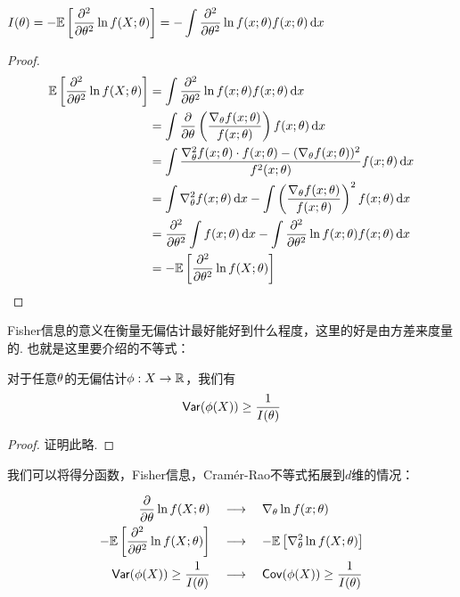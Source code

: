 \begin{proposition}
    $I(\theta) = -\mathbb{E}\left[
        \dfrac{\partial^2}{\partial\theta^2} \ln f(X;\theta)
    \right] = -\displaystyle\int \dfrac{\partial^2}{\partial\theta^2} \ln f(x;\theta) f(x;\theta) \mathop{}\!\mathrm{d}x$
\end{proposition}
\begin{proof}
    \begin{align*}
       \mathbb{E}\left[
        \dfrac{\partial^2}{\partial\theta^2} \ln f(X;\theta)
    \right] & =\int \dfrac{\partial^2}{\partial\theta^2} \ln f(x;\theta) f(x;\theta) \mathop{}\!\mathrm{d}x \\
    & = \int \dfrac{\partial}{\partial\theta} \left(
        \dfrac{\nabla_{\theta} f(x;\theta)}{f(x;\theta)}
    \right) f(x;\theta) \mathop{}\!\mathrm{d}x \\
    & = \int \dfrac{\nabla^2_{\theta} f(x;\theta)\cdot f(x;\theta) - (\nabla_{\theta} f(x;\theta))^2}{f^2(x;\theta)} f(x;\theta) \mathop{}\!\mathrm{d}x \\
    & = \int \nabla^2_{\theta} f(x;\theta) \mathop{}\!\mathrm{d}x - \int \left(\dfrac{\nabla_{\theta} f(x;\theta)}{f(x;\theta)}\right)^2 f(x;\theta) \mathop{}\!\mathrm{d}x \\
    & = \dfrac{\partial^2}{\partial\theta^2} \int f(x;\theta) \mathop{}\!\mathrm{d}x -\int \dfrac{\partial^2}{\partial\theta^2} \ln f(x;\theta) f(x;\theta) \mathop{}\!\mathrm{d}x \\
    & = -\mathbb{E}\left[
        \dfrac{\partial^2}{\partial\theta^2} \ln f(X;\theta)
    \right]
    \end{align*}
\end{proof} 

Fisher信息的意义在衡量无偏估计最好能好到什么程度，这里的好是由方差来度量的. 也就是这里要介绍的不等式：
\begin{theorem}
    对于任意$\theta$的无偏估计$\phi: X \rightarrow \mathbb{R}$，我们有 
    \[
    \mathsf{Var}(\phi(X)) \ge \dfrac{1}{I(\theta)}
    \]
\end{theorem}
\begin{proof}
    证明此略.
\end{proof}

我们可以将得分函数，Fisher信息，Cramér-Rao不等式拓展到$d$维的情况：

\begin{align*}
    \dfrac{\partial}{\partial\theta} \ln f(X;\theta) \quad & \longrightarrow \quad \nabla_{\theta} \ln f(x;\theta) \\ 
    -\mathbb{E}\left[
        \dfrac{\partial^2}{\partial\theta^2} \ln f(X;\theta)
    \right]\quad & \longrightarrow \quad -\mathbb{E}\left[
        \nabla^2_{\theta} \ln f(X;\theta)
    \right] \\
    \mathsf{Var}(\phi(X)) \ge \dfrac{1}{I(\theta)} \quad & \longrightarrow \quad  \mathsf{Cov}(\phi(X)) \ge \dfrac{1}{I(\theta)}
\end{align*}

